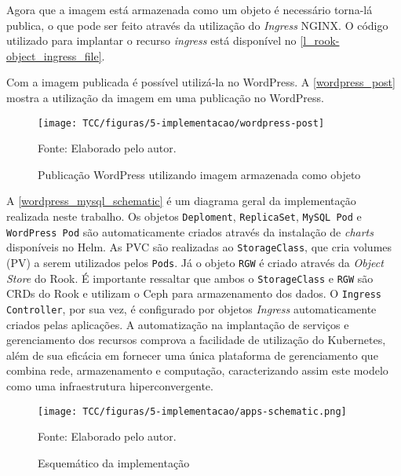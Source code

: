 Agora que a imagem está armazenada como um objeto é necessário torna-lá publica, o que pode ser feito através da utilização do \textit{Ingress} NGINX. O código utilizado para implantar o recurso \textit{ingress} está disponível no \autoref{l_rook-object_ingress_file}. 

Com a imagem publicada é possível utilizá-la no WordPress. A \autoref{wordpress_post} mostra a utilização da imagem em uma publicação no WordPress.

\begin{figure}[!htpb]
	\centering
	\caption{Publicação WordPress utilizando imagem armazenada como objeto}
    \texttt{[image: TCC/figuras/5-implementacao/wordpress-post]}
    
	Fonte: Elaborado pelo autor.
 	\label{wordpress_post}
\end{figure}

A \autoref{wordpress_mysql_schematic} é um diagrama geral da implementação realizada neste trabalho. Os objetos \texttt{Deploment}, \texttt{ReplicaSet}, \texttt{MySQL Pod} e \texttt{WordPress Pod} são automaticamente criados através da instalação de \textit{charts} disponíveis no Helm. As \ac{PVC} são realizadas ao \texttt{StorageClass}, que cria volumes (\ac{PV}) a serem utilizados pelos \texttt{Pods}. Já o objeto \texttt{RGW} é criado através da \textit{Object Store} do Rook. É importante ressaltar que ambos o \texttt{StorageClass} e \texttt{RGW} são \ac{CRD}s do Rook e utilizam o Ceph para armazenamento dos dados. O \texttt{Ingress Controller}, por sua vez, é configurado por objetos \textit{Ingress} automaticamente criados pelas aplicações. A automatização na implantação de serviços e gerenciamento dos recursos comprova a facilidade de utilização do Kubernetes, além de sua eficácia em fornecer uma única plataforma de gerenciamento que combina rede, armazenamento e computação, caracterizando assim este modelo como uma infraestrutura hiperconvergente.

\begin{figure}[!htpb]
	\centering
	\caption{Esquemático da implementação}
    \texttt{[image: TCC/figuras/5-implementacao/apps-schematic.png]}
    
	Fonte: Elaborado pelo autor.
 	\label{wordpress_mysql_schematic}
\end{figure}